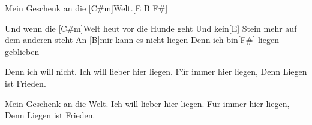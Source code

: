 \begin{guitar}
\begin{highlightbar}
		Mein Geschenk an die [C#m]Welt.[E B F#]{}
	\end{highlightbar}
	
	Und wenn die [C#m]Welt heut vor die Hunde geht
	Und kein[E] Stein mehr auf dem anderen steht
	An [B]mir kann es nicht liegen
	Denn ich bin[F#] liegen geblieben
	
	\begin{highlightbar}
		Denn ich will nicht.
		Ich will lieber hier liegen.
		Für immer hier liegen,
		Denn Liegen ist Frieden.
		
		Mein Geschenk an die Welt.
		Ich will lieber hier liegen.
		Für immer hier liegen,
		Denn Liegen ist Frieden.
	\end{highlightbar}
\end{guitar}
